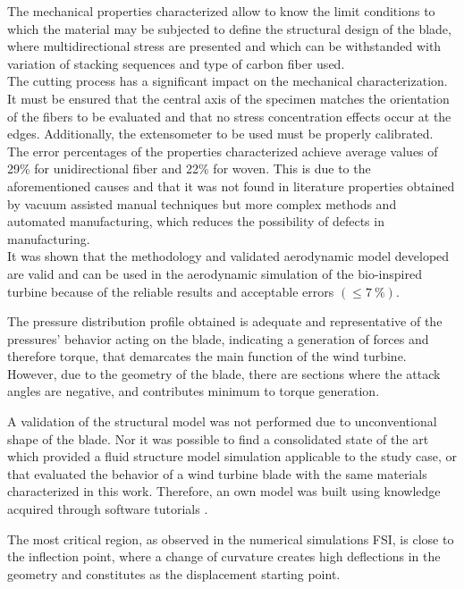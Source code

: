 The mechanical properties characterized allow to know the limit conditions to which the material may be subjected to define the structural design of the blade, where multidirectional stress are presented and which can be withstanded with variation of stacking sequences and type of carbon fiber used.\\

The cutting process has a significant impact on the mechanical characterization. It must be ensured that the central axis of the specimen matches the orientation of the fibers to be evaluated and that no stress concentration effects occur at the edges. Additionally, the extensometer to be used must be properly calibrated.\\

The error percentages of the properties characterized achieve average values of 29\% for unidirectional fiber and 22\% for woven. This is due to the aforementioned causes and that it was not found in literature properties obtained by vacuum assisted manual techniques but more complex methods and automated manufacturing, which reduces the possibility of defects in manufacturing.\\

It was shown that the methodology and validated aerodynamic model developed are valid and can be used in the aerodynamic simulation of the bio-inspired turbine because of the reliable results and acceptable errors $(\leq7~\%)$.


The pressure distribution profile obtained is adequate and representative of the pressures’ behavior acting on the blade, indicating a generation of forces and therefore torque, that demarcates the main function of the wind turbine. However, due to the geometry of the blade, there are sections where the attack angles are negative, and contributes minimum to torque generation.

 
A validation of the structural model was not performed due to unconventional shape of the blade. Nor it was possible to find a consolidated state of the art which provided a fluid structure model simulation applicable to the study case, or that evaluated the behavior of a wind turbine blade with the same materials characterized in this work. Therefore, an own model was built using knowledge acquired through software tutorials \cite{ansys}.


The most critical region, as observed in the numerical simulations FSI, is close to the inflection point, where a change of curvature creates high deflections in the geometry and constitutes as the displacement starting point.


